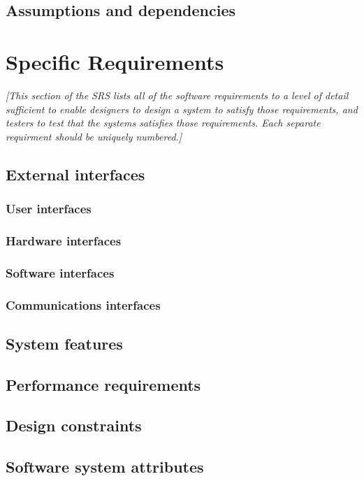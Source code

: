 \documentclass{article}
\begin{document}
\subsection{Assumptions and dependencies}


\section{Specific Requirements}
\label{sec:specific}
\emph{[This section of the \ac{SRS} lists all of the software requirements to
  a level of detail sufficient to enable designers to design a system to
  satisfy those requirements, and testers to test that the systems satisfies
  those requirements. Each separate requirment should be uniquely numbered.]}

\subsection{External interfaces}

\subsubsection{User interfaces}
\subsubsection{Hardware interfaces}
\subsubsection{Software interfaces}
\subsubsection{Communications interfaces}

\subsection{System features}
\subsection{Performance requirements}
\subsection{Design constraints}
\subsection{Software system attributes}
\end{document}
